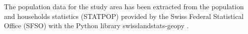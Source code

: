 \documentclass[12pt]{iopart}
\begin{document}
The population data for the study area has been extracted from the population and households statistics (STATPOP) \cite{sfso2020statistique} provided by the Swiss Federal Statistical Office (SFSO) with the Python library swisslandstats-geopy \cite{bosch2019swisslandstats}.








\end{document}
